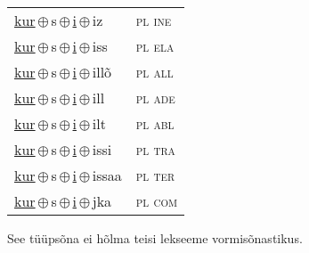 \begin{minipage}{\textwidth}
\begin{sideways}
\begin{tabular}{l l}
\underline{kur}\,$\oplus$\,s\,$\oplus$\,\underline{i}\,$\oplus$\,iz & \textsc{ pl ine } \\
\underline{kur}\,$\oplus$\,s\,$\oplus$\,\underline{i}\,$\oplus$\,iss & \textsc{ pl ela } \\
\underline{kur}\,$\oplus$\,s\,$\oplus$\,\underline{i}\,$\oplus$\,illõ & \textsc{ pl all } \\
\underline{kur}\,$\oplus$\,s\,$\oplus$\,\underline{i}\,$\oplus$\,ill & \textsc{ pl ade } \\
\underline{kur}\,$\oplus$\,s\,$\oplus$\,\underline{i}\,$\oplus$\,ilt & \textsc{ pl abl } \\
\underline{kur}\,$\oplus$\,s\,$\oplus$\,\underline{i}\,$\oplus$\,issi & \textsc{ pl tra } \\
\underline{kur}\,$\oplus$\,s\,$\oplus$\,\underline{i}\,$\oplus$\,issaa & \textsc{ pl ter } \\
\underline{kur}\,$\oplus$\,s\,$\oplus$\,\underline{i}\,$\oplus$\,jka & \textsc{ pl com } \\
\end{tabular}
\end{sideways}
\label{tab:tüüpsõnamall-kursi}

\end{minipage}

 
\vspace{1em}
\noindent See tüüpsõna ei hõlma teisi lekseeme vormi\-sõnastikus.
